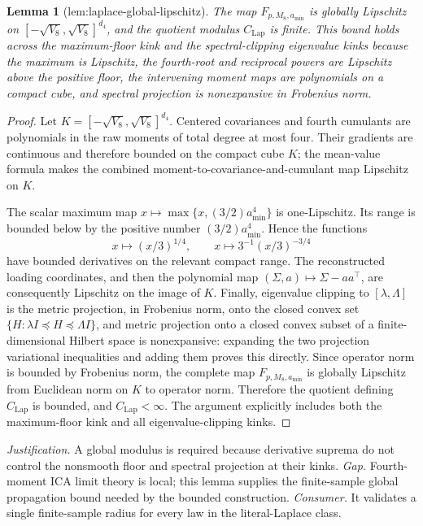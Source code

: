\documentclass{article}
\newtheorem{lemma}{Lemma}
\begin{document}
\begin{lemma}[lem:laplace-global-lipschitz]\label{lem:laplace-global-lipschitz}
The map \(F_{p,M_8,a_{\min}}\) is globally Lipschitz on \([-\sqrt{V_8},\sqrt{V_8}]^{d_4}\), and the quotient modulus \(C_{\mathrm{Lap}}\) is finite. This bound holds across the maximum-floor kink and the spectral-clipping eigenvalue kinks because the maximum is Lipschitz, the fourth-root and reciprocal powers are Lipschitz above the positive floor, the intervening moment maps are polynomials on a compact cube, and spectral projection is nonexpansive in Frobenius norm.
\end{lemma}
\begin{proof}
Let \(K=[-\sqrt{V_8},\sqrt{V_8}]^{d_4}\).  Centered covariances and fourth cumulants are polynomials in the raw moments of total degree at most four.  Their gradients are continuous and therefore bounded on the compact cube \(K\); the mean-value formula makes the combined moment-to-covariance-and-cumulant map Lipschitz on \(K\).

The scalar maximum map \(x\mapsto\max\{x,(3/2)a_{\min}^4\}\) is one-Lipschitz.  Its range is bounded below by the positive number \((3/2)a_{\min}^4\).  Hence the functions
\[
 x\longmapsto (x/3)^{1/4},\qquad x\longmapsto3^{-1}(x/3)^{-3/4}
\]
have bounded derivatives on the relevant compact range.  The reconstructed loading coordinates, and then the polynomial map \((\Sigma,a)\mapsto\Sigma-aa^\top\), are consequently Lipschitz on the image of \(K\).  Finally, eigenvalue clipping to \([\lambda,\Lambda]\) is the metric projection, in Frobenius norm, onto the closed convex set \(\{H:\lambda I\preceq H\preceq\Lambda I\}\), and metric projection onto a closed convex subset of a finite-dimensional Hilbert space is nonexpansive: expanding the two projection variational inequalities and adding them proves this directly.  Since operator norm is bounded by Frobenius norm, the complete map \(F_{p,M_8,a_{\min}}\) is globally Lipschitz from Euclidean norm on \(K\) to operator norm.  Therefore the quotient defining \(C_{\mathrm{Lap}}\) is bounded, and \(C_{\mathrm{Lap}}<\infty\).  The argument explicitly includes both the maximum-floor kink and all eigenvalue-clipping kinks.
\end{proof}
\par\smallskip\noindent \textit{Justification.} A global modulus is required because derivative suprema do not control the nonsmooth floor and spectral projection at their kinks. \textit{Gap.} Fourth-moment ICA limit theory is local; this lemma supplies the finite-sample global propagation bound needed by the bounded construction. \textit{Consumer.} It validates a single finite-sample radius for every law in the literal-Laplace class.
\end{document}
